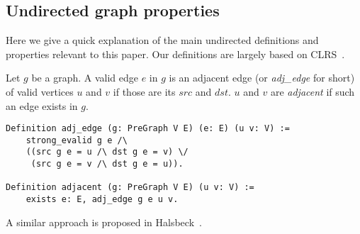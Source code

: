 \subsection{Undirected graph properties}

Here we give a quick explanation of the main undirected definitions and properties relevant to this paper. Our definitions are largely based on CLRS~\cite{clrs}.

Let $g$ be a graph. A valid edge $e$ in $g$ is an adjacent edge (or \textit{adj\_edge} for short) of valid vertices $u$ and $v$ if those are its $src$ and $dst$. $u$ and $v$ are \textit{adjacent} if such an edge exists in $g$.
\begin{lstlisting}
Definition adj_edge (g: PreGraph V E) (e: E) (u v: V) :=
	strong_evalid g e /\
	((src g e = u /\ dst g e = v) \/
	 (src g e = v /\ dst g e = u)).

Definition adjacent (g: PreGraph V E) (u v: V) :=
	exists e: E, adj_edge g e u v.
\end{lstlisting}
A similar approach is proposed in Halsbeck~\cite{DBLP:journals/afp/HaslbeckLB19}.

